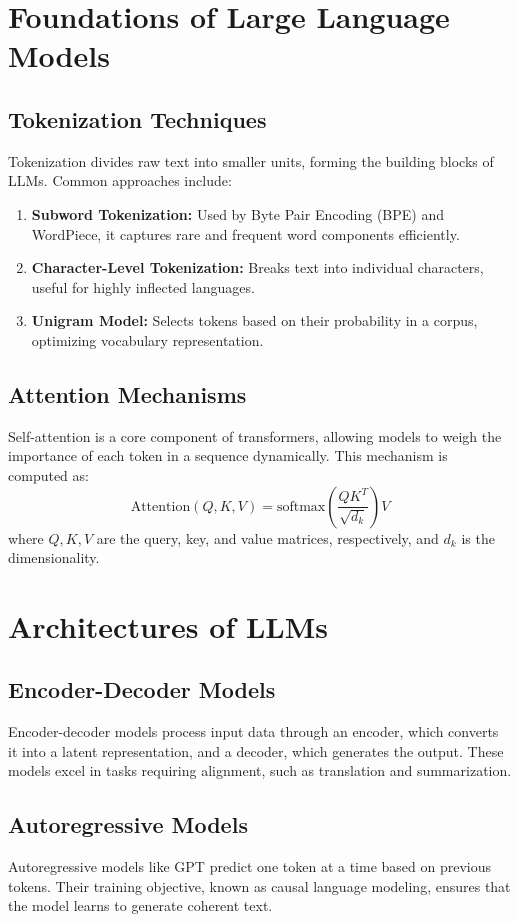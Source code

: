 \section{Foundations of Large Language Models}
\subsection{Tokenization Techniques}
Tokenization divides raw text into smaller units, forming the building blocks of LLMs. Common approaches include:
\begin{enumerate}
    \item \textbf{Subword Tokenization:} Used by Byte Pair Encoding (BPE) and WordPiece, it captures rare and frequent word components efficiently.
    \item \textbf{Character-Level Tokenization:} Breaks text into individual characters, useful for highly inflected languages.
    \item \textbf{Unigram Model:} Selects tokens based on their probability in a corpus, optimizing vocabulary representation.
\end{enumerate}

\subsection{Attention Mechanisms}
Self-attention is a core component of transformers, allowing models to weigh the importance of each token in a sequence dynamically. This mechanism is computed as:
\[
\text{Attention}(Q, K, V) = \text{softmax}\left(\frac{QK^T}{\sqrt{d_k}}\right)V
\]
where \( Q, K, V \) are the query, key, and value matrices, respectively, and \( d_k \) is the dimensionality.

\section{Architectures of LLMs}
\subsection{Encoder-Decoder Models}
Encoder-decoder models process input data through an encoder, which converts it into a latent representation, and a decoder, which generates the output. These models excel in tasks requiring alignment, such as translation and summarization.

\subsection{Autoregressive Models}
Autoregressive models like GPT predict one token at a time based on previous tokens. Their training objective, known as causal language modeling, ensures that the model learns to generate coherent text.

